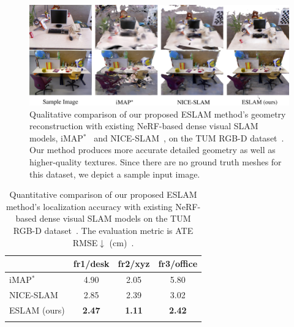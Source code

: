 \begin{figure}[t]
    \begin{center}
        \includegraphics[width=1.0\linewidth]{images/chapter4/figures/Fig6.jpg}
    \end{center}
    \caption{Qualitative comparison of our proposed ESLAM method's geometry reconstruction with existing NeRF-based dense visual SLAM models, iMAP$^*$~\citep{sucar2021imap} and NICE-SLAM~\citep{zhu2022nice}, on the TUM RGB-D dataset~\citep{sturm2012benchmark}. Our method produces more accurate detailed geometry as well as higher-quality textures. Since there are no ground truth meshes for this dataset, we depict a sample input image.}
    \label{fig:c4_qualitative_tum}
\end{figure}

\begin{table}[!t]
    \begin{center}
        \begin{tabular}{l|ccc}
            \Xhline{2\arrayrulewidth}
            & fr1/desk & fr2/xyz & fr3/office \\

            \hline
            iMAP$^{*}$~\citep{sucar2021imap} & 4.90 & 2.05 & 5.80 \\
            NICE-SLAM~\citep{zhu2022nice} & 2.85 & 2.39 & 3.02 \\
            ESLAM (ours) & \textbf{2.47} & \textbf{1.11} & \textbf{2.42} \\ 
            
            \Xhline{2\arrayrulewidth}
        \end{tabular}
    \end{center}
    \caption{Quantitative comparison of our proposed ESLAM method's localization accuracy with existing NeRF-based dense visual SLAM models on the TUM RGB-D dataset~\citep{sturm2012benchmark}. The evaluation metric is ATE RMSE$\downarrow$ (cm)~\citep{sturm2012benchmark}.}
    \label{table:tum}
\end{table}

